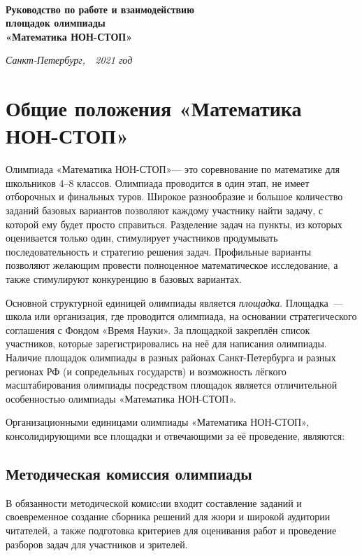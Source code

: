 \documentclass[a4paper,12pt]{article}
\newcommand{\mns}{«Математика НОН-СТОП»\xspace}
\begin{document}
\begin{center} {\LARGE\bf \ \\
	Руководство по работе и взаимодействию \\
	площадок олимпиады \\
	\mns \\}
\end{center}

\begin{flushright} {\it
	Санкт-Петербург,\ \ 2021 год}
\end{flushright}

\section{Общие положения \mns}

Олимпиада \mns — это соревнование по математике для школьников 4–8 классов. Олимпиада проводится в один этап, не имеет отборочных и финальных туров. Широкое разнообразие и большое количество заданий базовых вариантов позволяют каждому участнику найти задачу, с которой ему будет просто справиться. Разделение задач на пункты, из которых оценивается только один, стимулирует участников продумывать последовательность и стратегию решения задач. Профильные варианты позволяют желающим провести полноценное математическое исследование, а также стимулируют конкуренцию в базовых вариантах.

Основной структурной единицей олимпиады является {\itshape площадка}. Площадка~— школа или организация, где проводится олимпиада, на основании стратегического соглашения с Фондом «Время Науки». За площадкой закреплён список участников, которые зарегистрировались на неё для написания олимпиады. Наличие площадок олимпиады в разных районах Санкт-Петербурга и разных регионах РФ (и сопредельных государств) и возможность лёгкого масштабирования олимпиады посредством площадок является отличительной особенностью олимпиады \mns.

Организационными единицами олимпиады \mns, консолидирующими все площадки и отвечающими за её проведение, являются:

\subsection{Методическая комиссия олимпиады}

В обязанности методической комисcии входит составление заданий и своевременное создание сборника решений для жюри и широкой аудитории читателей, а также подготовка критериев для оценивания работ и проведение разборов задач для участников и зрителей.
\end{document}
